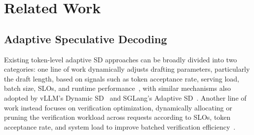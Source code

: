 \section{Related Work}

\subsection{Adaptive Speculative Decoding}
Existing token-level adaptive SD approaches can be broadly divided into two categories: one line of work dynamically adjusts drafting parameters, particularly the draft length, based on signals such as token acceptance rate, serving load, batch size, SLOs, and runtime performance~\citep{SpecDec++,TurboSpec,BanditSpec,AdaSpec,Nightjar,Learning_To_Draft}, with similar mechanisms also adopted by vLLM's Dynamic SD~\citep{vLLM} and SGLang's Adaptive SD~\citep{SGLang}.
Another line of work instead focuses on verification optimization, dynamically allocating or pruning the verification workload across requests according to SLOs, token acceptance rate, and system load to improve batched verification efficiency~\citep{AdaServe,D-Cut,ECHO,DSpark}.
